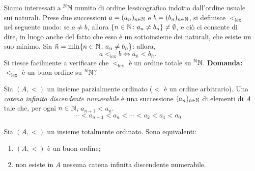 Siamo interessati a \({}^{\mathbb{N}}\mathbb{N}\) munito di ordine lessicografico indotto dall'ordine usuale sui naturali. Prese due successioni \(a = (a_n)_{n \in \mathbb{N}}\) e \(b = (b_n)_{n \in \mathbb{N}}\), si definisce \(<_{\mathrm{lex}}\) nel seguente modo: se \(a \neq b\), allora \(\lbrace n \in \mathbb{N} \colon a_n \neq b_n\rbrace \neq \emptyset\), e ciò ci consente di dire, in luogo anche del fatto che esso è un sottoinsieme dei naturali, che esiste un suo minimo. Sia \(\bar{n} = \min \lbrace n \in \mathbb{N} \colon a_n \neq b_n \rbrace\): allora,
\[
a <_{\mathrm{lex}} b \iff a_{\bar{n}} < b_{\bar{n}}.
\]
Si riesce facilmente a verificare che \(<_{\mathrm{lex}}\) è un ordine totale su \({}^{\mathbb{N}}\mathbb{N}\). {\bf Domanda:} \(<_{\mathrm{lex}}\) è un buon ordine su \({}^{\mathbb{N}}\mathbb{N}\)?
\begin{dfn}
  Sia \((A, <)\) un insieme parzialmente ordinato (\(<\) è un ordine arbitrario). Una \emph{catena infinita discendente numerabile} è una successione \((a_n)_{n \in \mathbb{N}}\) di elementi di \(A\) tale che, per ogni \(n \in \mathbb{N}\), \(a_{n+1} < a_n\).
  \[
  \dotsb < a_{n+1} < a_n < \dotsb < a_2 < a_1 < a_0
  \]
\end{dfn}
\begin{thm}
  Sia \((A, <)\) un insieme totalmente ordinato. Sono equivalenti:
  \begin{enumerate}
    \item \((A,<)\) è un buon ordine;
    \item non esiste in \(A\) nessuna catena infinita discendente numerabile.
  \end{enumerate}
\end{thm}
